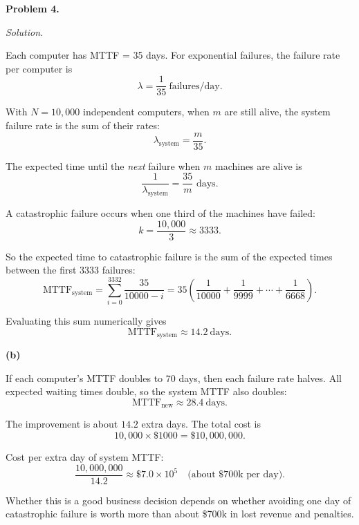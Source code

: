 \documentclass[12pt]{article}
\newcommand{\problem}[1]{\vspace{0.5em}\noindent\textbf{Problem #1.}\vspace{0.3em}}
\newenvironment{solution}{\par\noindent\textit{Solution.}}{\par\vspace{1em}}
\newcommand{\subproblem}[1]{\par\noindent\textbf{(#1)}\quad}
\begin{document}
\problem{4}
\begin{solution}

Each computer has MTTF = 35 days. For exponential failures, the failure
rate per computer is
\[
\lambda = \frac{1}{35}\ \text{failures/day}.
\]

With $N=10{,}000$ independent computers, when $m$ are still alive, the
system failure rate is the sum of their rates:
\[
\lambda_{\text{system}} = \frac{m}{35}.
\]

The expected time until the \emph{next} failure when $m$ machines are alive is
\[
\frac{1}{\lambda_{\text{system}}} = \frac{35}{m} \text{ days}.
\]

A catastrophic failure occurs when one third of the machines have failed:
\[
k = \frac{10{,}000}{3} \approx 3333.
\]

So the expected time to catastrophic failure is the sum of the expected times
between the first 3333 failures:
\[
\text{MTTF}_{\text{system}}
= \sum_{i=0}^{3332} \frac{35}{10000 - i}
= 35 \left(
\frac{1}{10000} + \frac{1}{9999} + \cdots + \frac{1}{6668}
\right).
\]

Evaluating this sum numerically gives
\[
\boxed{\text{MTTF}_{\text{system}} \approx 14.2\ \text{days}.}
\]

\subproblem{b}

If each computer’s MTTF doubles to 70 days, then each failure rate halves.
All expected waiting times double, so the system MTTF also doubles:
\[
\text{MTTF}_{\text{new}} \approx 28.4\ \text{days}.
\]

The improvement is about $14.2$ extra days. The total cost is
\[
10{,}000 \times \$1000 = \$10{,}000{,}000.
\]

Cost per extra day of system MTTF:
\[
\frac{10{,}000{,}000}{14.2}
\approx \$7.0 \times 10^5
\quad \text{(about \$700k per day)}.
\]

Whether this is a good business decision depends on whether avoiding one day
of catastrophic failure is worth more than about \$700k in lost revenue and
penalties.

\end{solution}
\end{document}
